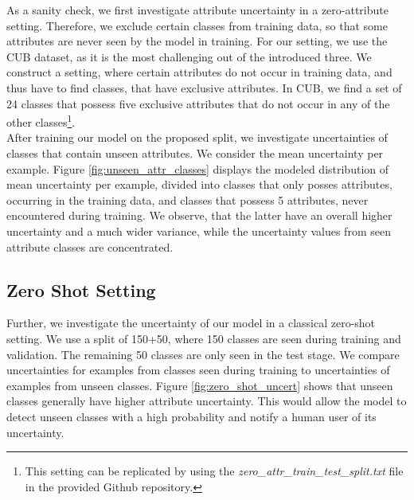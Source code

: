 \documentclass[a4paper,cleardoubleempty,BCOR1cm, 11pt]{report}
\begin{document}
As a sanity check, we first investigate attribute uncertainty in a zero-attribute setting. Therefore, we exclude certain classes from training data, so that some attributes are never seen by the model in training. For our setting, we use the CUB dataset, as it is the most challenging out of the introduced three. We construct a setting, where certain attributes do not occur in training data, and thus have to find classes, that have exclusive attributes. In CUB, we find a set of 24 classes that possess five exclusive attributes that do not occur in any of the other classes\footnote{This setting can be replicated by using the \textit{zero\_attr\_train\_test\_split.txt} file in the provided Github repository.}.\\
After training our model on the proposed split, we investigate uncertainties of classes that contain unseen attributes. We consider the mean uncertainty per example.
Figure \ref{fig:unseen_attr_classes} displays the modeled distribution of mean uncertainty per example, divided into classes that only posses attributes, occurring in the training data, and classes that possess 5 attributes, never encountered during training. We observe, that the latter have an overall higher uncertainty and a much wider variance, while the uncertainty values from seen attribute classes are concentrated.

\subsection{Zero Shot Setting}
Further, we investigate the uncertainty of our model in a classical zero-shot setting. We use a split of 150+50, where 150 classes are seen during training and validation. The remaining 50 classes are only seen in the test stage. We compare uncertainties for examples from classes seen during training to uncertainties of examples from unseen classes. Figure \ref{fig:zero_shot_uncert} shows that unseen classes generally have higher attribute uncertainty. This would allow the model to detect unseen classes with a high probability and notify a human user of its uncertainty.

\end{document}
